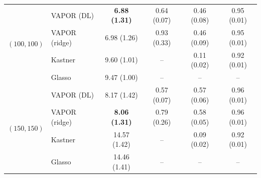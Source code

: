 \begin{table}[t]
\begin{tabular}{llcccc}
\midrule
\multirow{4}{*}{$(100,100)$}
  & VAPOR (DL)    & \textbf{6.88 (1.31)} & 0.64 (0.07) & 0.46 (0.08) & 0.95 (0.01)\\
  & VAPOR (ridge) & 6.98 (1.26) & 0.93 (0.33) & 0.46 (0.09) & 0.95 (0.01)\\
  & Kastner       & 9.60 (1.01) & --          & 0.11 (0.02) & 0.92 (0.01)\\
  & Glasso        & 9.47 (1.00) & --          & --          & --\\
\midrule
\multirow{4}{*}{$(150,150)$}
  & VAPOR (DL)    & 8.17 (1.42) & 0.57 (0.07) & 0.57 (0.06) & 0.96 (0.01)\\
  & VAPOR (ridge) & \textbf{8.06 (1.31)} & 0.79 (0.26) & 0.58 (0.05) & 0.96 (0.01)\\
  & Kastner       & 14.57 (1.42)& --          & 0.09 (0.02) & 0.92 (0.01)\\
  & Glasso        & 14.46 (1.41)& --          & --          & --\\
\bottomrule
\end{tabular}
\end{table}

